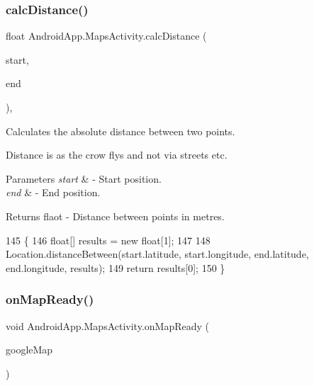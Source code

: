 \subsubsection{\texorpdfstring{calc\+Distance()}{calcDistance()}}
{\footnotesize\ttfamily float Android\+App.\+Maps\+Activity.\+calc\+Distance (\begin{DoxyParamCaption}\item[{Lat\+Lng}]{start,  }\item[{Lat\+Lng}]{end }\end{DoxyParamCaption})\hspace{0.3cm}{\ttfamily [inline]}, {\ttfamily [private]}}



Calculates the absolute distance between two points. 

Distance is as the crow flys and not via streets etc. 
\begin{DoxyParams}{Parameters}
{\em start} & -\/ Start position. \\
\hline
{\em end} & -\/ End position. \\
\hline
\end{DoxyParams}
\begin{DoxyReturn}{Returns}
flaot -\/ Distance between points in metres. 
\end{DoxyReturn}

\begin{DoxyCode}
145     \{
146         \textcolor{keywordtype}{float}[] results = \textcolor{keyword}{new} \textcolor{keywordtype}{float}[1];
147 
148         Location.distanceBetween(start.latitude, start.longitude, end.latitude, end.longitude, results);
149         \textcolor{keywordflow}{return} results[0];
150     \}
\end{DoxyCode}
\mbox{\label{class_android_app_1_1_maps_activity_abee115dd67628da8e1140430428ce112}} 
\subsubsection{\texorpdfstring{on\+Map\+Ready()}{onMapReady()}}
{\footnotesize\ttfamily void Android\+App.\+Maps\+Activity.\+on\+Map\+Ready (\begin{DoxyParamCaption}\item[{Google\+Map}]{google\+Map }\end{DoxyParamCaption})\hspace{0.3cm}{\ttfamily [inline]}}




